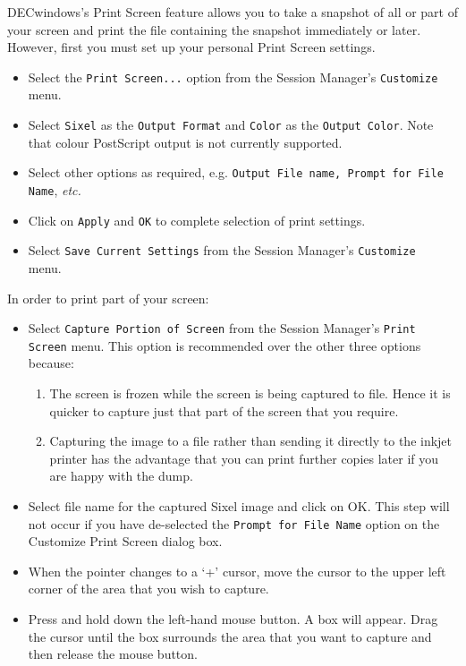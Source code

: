 DECwindows's Print Screen feature allows you to take a snapshot of all or part
of your screen and print the file containing the snapshot immediately or later.
However, first you must set up your personal Print Screen settings.

\begin{itemize}

\item Select the {\tt Print Screen...} option from the Session Manager's
{\tt Customize} menu.

\item Select {\tt Sixel} as the {\tt Output Format} and {\tt Color} as the
{\tt Output Color}. Note that colour PostScript output is not currently
supported.

\item Select other options as required, e.g. {\tt Output File name, Prompt for
File Name}, {\it etc.}

\item Click on {\tt Apply} and {\tt OK} to complete selection of print settings.

\item Select {\tt Save Current Settings} from the Session Manager's
{\tt Customize }
menu.

\end{itemize}

In order to print part of your screen:

\begin{itemize}

\item Select {\tt Capture Portion of Screen} from the Session Manager's
{\tt Print Screen} menu. This option is recommended over the other three options
because:

\begin{enumerate}

\item The screen is frozen while the screen is being captured to file. Hence it
is quicker to capture just that part of the screen that you require.

\item Capturing the image to a file rather than sending it directly to the
inkjet printer has the advantage that you can print further copies later
if you are happy with the dump.

\end{enumerate}

\item Select file name for the captured Sixel image and click on OK. This step
will not occur if you have de-selected the {\tt Prompt for File Name} option on
the Customize Print Screen dialog box.

\item When the pointer changes to a `+' cursor, move the cursor to the upper
left corner of the area that you wish to capture.

\item Press and hold down the left-hand mouse button. A box will appear. Drag
the cursor until the box surrounds the area that you want to capture and
then release the mouse button.

\end{itemize}

